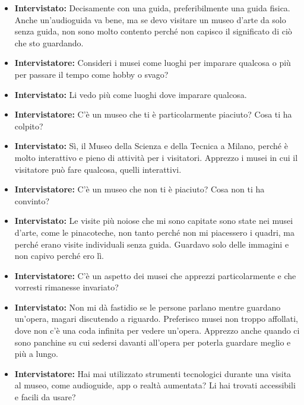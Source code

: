\documentclass{article}
\begin{document}
\begin{itemize}
    \item \textbf{Intervistato:} Decisamente con una guida, preferibilmente una guida fisica. Anche un’audioguida va bene, ma se devo visitare un museo d’arte da solo senza guida, non sono molto contento perché non capisco il significato di ciò che sto guardando.

    \item \textbf{Intervistatore:} Consideri i musei come luoghi per imparare qualcosa o più per passare il tempo come hobby o svago?

    \item \textbf{Intervistato:} Li vedo più come luoghi dove imparare qualcosa.

    \item \textbf{Intervistatore:} C’è un museo che ti è particolarmente piaciuto? Cosa ti ha colpito?

    \item \textbf{Intervistato:} Sì, il Museo della Scienza e della Tecnica a Milano, perché è molto interattivo e pieno di attività per i visitatori. Apprezzo i musei in cui il visitatore può fare qualcosa, quelli interattivi.

    \item \textbf{Intervistatore:} C’è un museo che non ti è piaciuto? Cosa non ti ha convinto?

    \item \textbf{Intervistato:} Le visite più noiose che mi sono capitate sono state nei musei d’arte, come le pinacoteche, non tanto perché non mi piacessero i quadri, ma perché erano visite individuali senza guida. Guardavo solo delle immagini e non capivo perché ero lì.

    \item \textbf{Intervistatore:} C’è un aspetto dei musei che apprezzi particolarmente e che vorresti rimanesse invariato?

    \item \textbf{Intervistato:} Non mi dà fastidio se le persone parlano mentre guardano un’opera, magari discutendo a riguardo. Preferisco musei non troppo affollati, dove non c’è una coda infinita per vedere un’opera. Apprezzo anche quando ci sono panchine su cui sedersi davanti all’opera per poterla guardare meglio e più a lungo.

    \item \textbf{Intervistatore:} Hai mai utilizzato strumenti tecnologici durante una visita al museo, come audioguide, app o realtà aumentata? Li hai trovati accessibili e facili da usare?


\end{itemize}
\end{document}

